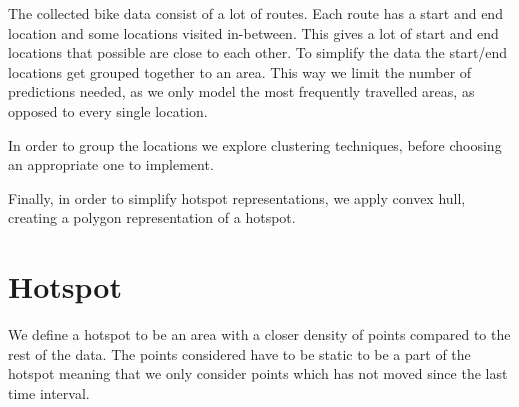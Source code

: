The collected bike data consist of a lot of routes.
Each route has a start and end location and some locations visited in-between.
This gives a lot of start and end locations that possible are close to each other.
To simplify the data the start/end locations get grouped together to an area.
This way we limit the number of predictions needed, as we only model the most frequently travelled areas, as opposed to every single location.

In order to group the locations we explore clustering techniques, before choosing an appropriate one to implement.

Finally, in order to simplify hotspot representations, we apply convex hull, creating a polygon representation of a hotspot.

\section{Hotspot}\label{hotspot}
We define a hotspot to be an area with a closer density of points compared to the rest of the data.
The points considered have to be static to be a part of the hotspot meaning that we only consider points which has not moved since the last time interval.
